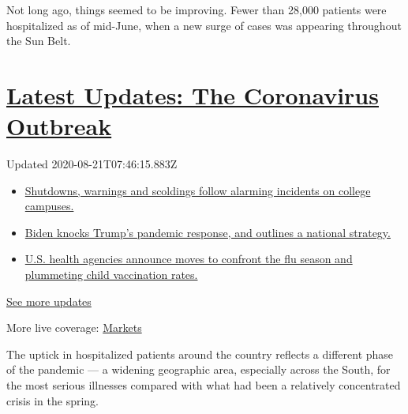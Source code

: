 Not long ago, things seemed to be improving. Fewer than 28,000 patients
were hospitalized as of mid-June, when a new surge of cases was
appearing throughout the Sun Belt.

\hypertarget{latest-updates-the-coronavirus-outbreak}{%
\section{\texorpdfstring{\href{https://www.nytimes3xbfgragh.onion/2020/08/20/world/coronavirus-covid.html?action=click\&pgtype=Article\&state=default\&region=MAIN_CONTENT_1\&context=storylines_live_updates}{Latest
Updates: The Coronavirus
Outbreak}}{Latest Updates: The Coronavirus Outbreak}}\label{latest-updates-the-coronavirus-outbreak}}

Updated 2020-08-21T07:46:15.883Z

\begin{itemize}
\tightlist
\item
  \href{https://www.nytimes3xbfgragh.onion/2020/08/20/world/coronavirus-covid.html?action=click\&pgtype=Article\&state=default\&region=MAIN_CONTENT_1\&context=storylines_live_updates\#link-68774d88}{Shutdowns,
  warnings and scoldings follow alarming incidents on college campuses.}
\item
  \href{https://www.nytimes3xbfgragh.onion/2020/08/20/world/coronavirus-covid.html?action=click\&pgtype=Article\&state=default\&region=MAIN_CONTENT_1\&context=storylines_live_updates\#link-26b58724}{Biden
  knocks Trump's pandemic response, and outlines a national strategy.}
\item
  \href{https://www.nytimes3xbfgragh.onion/2020/08/20/world/coronavirus-covid.html?action=click\&pgtype=Article\&state=default\&region=MAIN_CONTENT_1\&context=storylines_live_updates\#link-4e542da3}{U.S.
  health agencies announce moves to confront the flu season and
  plummeting child vaccination rates.}
\end{itemize}

\href{https://www.nytimes3xbfgragh.onion/2020/08/20/world/coronavirus-covid.html?action=click\&pgtype=Article\&state=default\&region=MAIN_CONTENT_1\&context=storylines_live_updates}{See
more updates}

More live coverage:
\href{https://www.nytimes3xbfgragh.onion/live/2020/08/20/business/stock-market-today-coronavirus?action=click\&pgtype=Article\&state=default\&region=MAIN_CONTENT_1\&context=storylines_live_updates}{Markets}

The uptick in hospitalized patients around the country reflects a
different phase of the pandemic --- a widening geographic area,
especially across the South, for the most serious illnesses compared
with what had been a relatively concentrated crisis in the spring.

